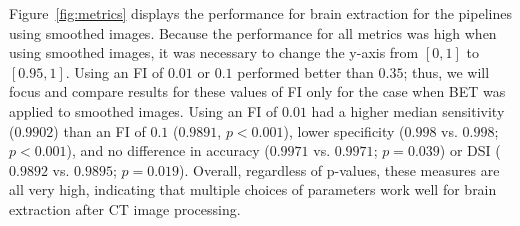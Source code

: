 \documentclass{elsarticle}\usepackage[]{graphicx}\usepackage[]{color}
\begin{document}
Figure~\ref{fig:metrics}\protect{} displays the performance for brain extraction for the pipelines using smoothed images.   Because the performance for all metrics was high when using smoothed images, it was necessary to change the y-axis from $[0,1]$ to $[0.95,1]$. 
Using an FI of $0.01$ or $0.1$ performed better than $0.35$; thus, we will focus and compare results for these values of FI only for the case when BET was applied to smoothed images.  Using an FI of $0.01$ had a higher median sensitivity ($0.9902$) than an FI of $0.1$ ($0.9891$, $p< 0.001$), lower specificity ($0.998$ vs. $0.998$; $p< 0.001$), and no difference in accuracy ($0.9971$ vs. $0.9971$; $p= 0.039$) or DSI ($0.9892$ vs. $0.9895$; $p= 0.019$).  Overall, regardless of p-values, these measures are all very high, indicating that multiple choices of parameters work well for brain extraction after CT image processing.

% 
% 
\end{document}
